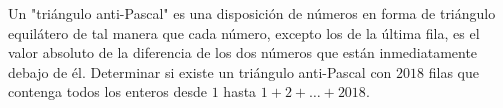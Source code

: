 Un "triángulo anti-Pascal" es una disposición de números en forma de triángulo equilátero de tal manera que cada número, excepto los de la última fila, es el valor absoluto de la diferencia de los dos números que están inmediatamente debajo de él. Determinar si existe un triángulo anti-Pascal con $2018$ filas que contenga todos los enteros desde $1$ hasta $1+2+\dots+2018$.